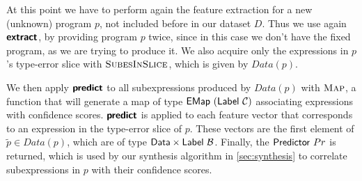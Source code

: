 At this point we have to perform again the feature extraction for a new
(unknown) program $p$, not included before in our dataset $D$. Thus we use again
$\bm{\mathsf{extract}}$, by providing program $p$ twice, since in this case we don't have
the fixed program, as we are trying to produce it. We also acquire only the
expressions in $p$'s type-error slice with $\textsc{SubesInSlice}$, which is
given by $Data(p)$.

We then apply $\bm{\mathsf{predict}}$ to all subexpressions produced by $Data(p)$ with
$\textsc{Map}$, a function that will generate a map of type
$\mathsf{EMap}\ (\mathsf{Label}\ \mathcal{C})$ associating expressions with confidence scores.
$\bm{\mathsf{predict}}$ is applied to each feature vector that corresponds to an
expression in the type-error slice of $p$. These vectors are the first element
of $\tilde{p} \in Data(p)$, which are of type $\mathsf{Data} \times
\mathsf{Label}\ \mathcal{B}$. Finally, the $\mathsf{Predictor}\ Pr$ is returned, which is used
by our synthesis algorithm in \autoref{sec:synthesis} to correlate
subexpressions in $p$ with their confidence scores.


